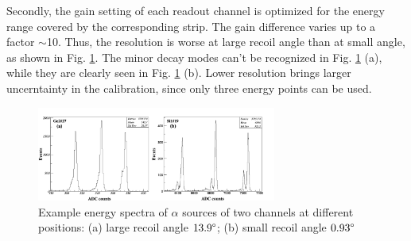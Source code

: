 \documentclass[number,5p]{elsarticle}
\begin{document}
Secondly, the gain setting of each readout channel is optimized for the energy range covered by the corresponding strip.
The gain difference varies up to a factor $\mathtt{\sim}$10.
Thus, the resolution is worse at large recoil angle than at small angle, as shown in Fig. \ref{fig:alpha_spectrum}.
The minor decay modes can't be recognized in Fig. \ref{fig:alpha_spectrum} (a), while they are clearly seen in Fig. \ref{fig:alpha_spectrum} (b).
Lower resolution brings larger uncerntainty in the calibration, since only three energy points can be used.
\begin{figure}[htb!]
  \centering
  \includegraphics[width=0.7\textwidth]{./alpha_response.png}
  \caption{Example energy spectra of \(\alpha\) sources of two channels at different positions: (a) large recoil angle $13.9\degree$; (b) small recoil angle $0.93\degree$}
  \label{fig:alpha_spectrum}
\end{figure}
\end{document}
